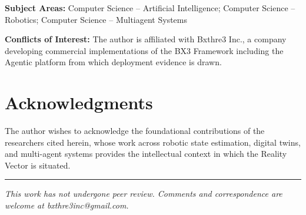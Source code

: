 \documentclass[12pt]{article}
\begin{document}
\textbf{Subject Areas:} Computer Science -- Artificial Intelligence; Computer Science -- Robotics; Computer Science -- Multiagent Systems

\textbf{Conflicts of Interest:} The author is affiliated with Bxthre3 Inc., a company developing commercial implementations of the BX3 Framework including the Agentic platform from which deployment evidence is drawn.

\section*{Acknowledgments}

The author wishes to acknowledge the foundational contributions of the researchers cited herein, whose work across robotic state estimation, digital twins, and multi-agent systems provides the intellectual context in which the Reality Vector is situated.




\vspace{2em}
\hrule
\vspace{0.5em}
\noindent\small\textit{This work has not undergone peer review. Comments and correspondence are welcome at bxthre3inc@gmail.com.}
\end{document}
